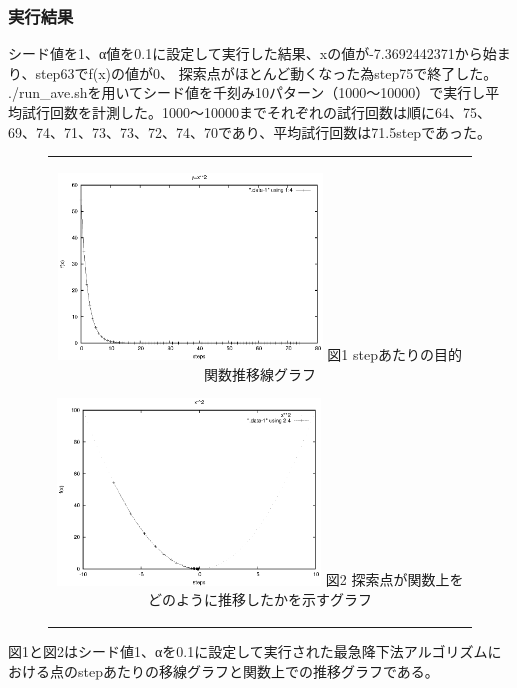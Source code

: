 \subsubsection{実行結果}

シード値を1、α値を0.1に設定して実行した結果、xの値が-7.3692442371から始まり、step63でf(x)の値が0、
探索点がほとんど動くなった為step75で終了した。\\
./run\_ave.shを用いてシード値を千刻み10パターン（1000〜10000）で実行し平均試行回数を計測した。1000〜10000までそれぞれの試行回数は順に64、75、69、74、71、73、73、72、74、70であり、平均試行回数は71.5stepであった。
\newline
\begin{figure}[htbp]
  \begin{center}
    \begin{tabular}{c}

      \begin{minipage}{0.5\hsize}
        \begin{center}
          \includegraphics[clip, width=7cm]{./figs/sim2-1_step-1.eps}
          \hspace{1.6cm} 図1 stepあたりの目的関数推移線グラフ
        \end{center}
      \end{minipage}

      \begin{minipage}{0.5\hsize}
        \begin{center}
          \includegraphics[clip, width=7cm]{./figs/sim2-1-1.eps}
          \hspace{1.6cm} 図2 探索点が関数上をどのように推移したかを示すグラフ
        \end{center}
      \end{minipage}

    \end{tabular}
  \end{center}
\end{figure}
\newline
図1と図2はシード値1、αを0.1に設定して実行された最急降下法アルゴリズムにおける点のstepあたりの移線グラフと関数上での推移グラフである。
